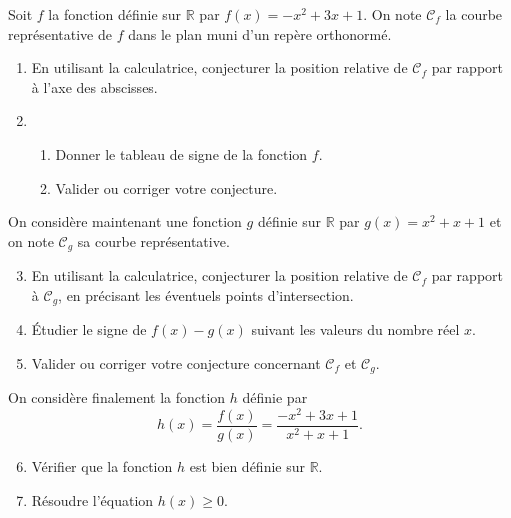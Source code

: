 \documentclass[11pt]{article}
\newcommand{\Cf}{\mathscr{C}_{f}}
\newcommand{\Cg}{\mathscr{C}_{g}}
\begin{document}
\begin{exo}[$6,5$ points]
  Soit $f$ la fonction définie sur $\mathbb{R}$ par $f(x) = -x^2+3x+1$. On note
  $\Cf$ la courbe représentative de $f$ dans le plan muni d'un repère
  orthonormé.
  \begin{enumerate}
    \item En utilisant la calculatrice, conjecturer la position relative de
      $\Cf$ par rapport à l'axe des abscisses.
    \item \begin{enumerate}
        \item Donner le tableau de signe de la fonction $f$.
        \item Valider ou corriger votre conjecture.
      \end{enumerate}
  \end{enumerate}
  On considère maintenant une fonction $g$ définie sur $\mathbb{R}$ par $g(x) =
  x^2+x+1$ et on note $\Cg$ sa courbe représentative.
  \begin{enumerate}
      \setcounter{enumi}{2}
    \item En utilisant la calculatrice, conjecturer la position relative de
      $\Cf$ par rapport à $\Cg$, en précisant les éventuels points
      d'intersection.
    \item Étudier le signe de $f(x)-g(x)$ suivant les valeurs du nombre réel
      $x$.
    \item Valider ou corriger votre conjecture concernant $\Cf$ et $\Cg$.
  \end{enumerate}
  On considère finalement la fonction $h$ définie par
  \[
    h(x) = \frac{f(x)}{g(x)} = \frac{-x^2+3x+1}{x^2+x+1}.
  \]
  \begin{enumerate}
      \setcounter{enumi}{5}
    \item Vérifier que la fonction $h$ est bien définie sur $\mathbb{R}$.
    \item Résoudre l'équation $h(x)\geq0$.
  \end{enumerate}
\end{exo}
\end{document}

